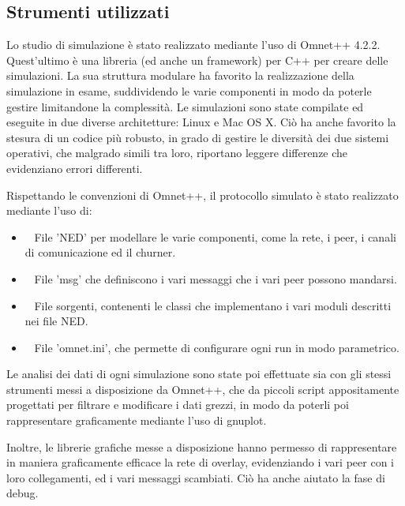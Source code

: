 \documentclass[prodmode,acmtap]{acmlarge}
\begin{document}
\subsection{Strumenti utilizzati}

Lo studio di simulazione è stato realizzato mediante l'uso di Omnet++ 4.2.2\cite{omnet++}. Quest'ultimo è una libreria (ed anche un framework) per C++ per creare delle simulazioni. La sua struttura modulare ha favorito la realizzazione della simulazione in esame, suddividendo le varie componenti in modo da poterle gestire limitandone la complessità. Le simulazioni sono state compilate ed eseguite in due diverse architetture: Linux e Mac OS X. Ciò ha anche favorito la stesura di un codice più robusto, in grado di gestire le diversità dei due sistemi operativi, che malgrado simili tra loro, riportano leggere differenze che evidenziano errori differenti.

Rispettando le convenzioni di Omnet++, il protocollo simulato è stato realizzato mediante l'uso di:

\begin{itemize}
	\item ~ File 'NED' per modellare le varie componenti, come la rete, i peer, i canali di comunicazione ed il churner.
	\item ~ File 'msg' che definiscono i vari messaggi che i vari peer possono mandarsi.
	\item ~ File sorgenti, contenenti le classi che implementano i vari moduli descritti nei file NED.
	\item ~ File 'omnet.ini', che permette di configurare ogni run in modo parametrico.
\end{itemize}

Le analisi dei dati di ogni simulazione sono state poi effettuate sia con gli stessi strumenti messi a disposizione da Omnet++, che da piccoli script appositamente progettati per filtrare e modificare i dati grezzi, in modo da poterli poi rappresentare graficamente mediante l'uso di gnuplot.

Inoltre, le librerie grafiche messe a disposizione hanno permesso di rappresentare in maniera graficamente efficace la rete di overlay, evidenziando i vari peer con i loro collegamenti, ed i vari messaggi scambiati. Ciò ha anche aiutato la fase di debug.
\end{document}

